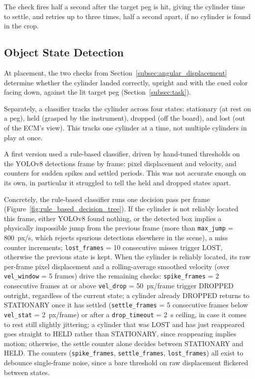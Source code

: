 The check fires half a second after the target peg is hit, giving the
cylinder time to settle, and retries up to three times, half a second
apart, if no cylinder is found in the crop.

\subsection{Object State Detection}
\label{subsec:object_state}

At placement, the two checks from
Section~\ref{subsec:angular_displacement} determine whether the
cylinder landed correctly, upright and with the cued color facing
down, against the lit target peg (Section~\ref{subsec:task}).

Separately, a classifier tracks the cylinder across four states:
stationary (at rest on a peg), held (grasped by the instrument),
dropped (off the board), and lost (out of the ECM's view). This
tracks one cylinder at a time, not multiple cylinders in play at once.

A first version used a rule-based classifier, driven by hand-tuned
thresholds on the YOLOv8 detections frame by frame: pixel
displacement and velocity, and counters for sudden spikes and settled
periods. This was not accurate enough on its own, in particular it
struggled to tell the held and dropped states apart.

Concretely, the rule-based classifier runs one decision pass per
frame (Figure~\ref{fig:rule_based_decision_tree}). If the cylinder is
not reliably located this frame, either YOLOv8 found nothing, or the
detected box implies a physically impossible jump from the previous
frame (more than \texttt{max\_jump} = 800~px/s, which rejects spurious
detections elsewhere in the scene), a miss counter increments;
\texttt{lost\_frames} = 10 consecutive misses trigger LOST, otherwise
the previous state is kept. When the cylinder is reliably located,
its raw per-frame pixel displacement and a rolling-average smoothed
velocity (over \texttt{vel\_window} = 5 frames) drive the remaining
checks: \texttt{spike\_frames} = 2 consecutive frames at or above
\texttt{vel\_drop} = 50~px/frame trigger DROPPED outright, regardless
of the current state; a cylinder already DROPPED returns to
STATIONARY once it has settled (\texttt{settle\_frames} = 5
consecutive frames below \texttt{vel\_stat} = 2~px/frame) or after a
\texttt{drop\_timeout} = 2~s ceiling, in case it comes to rest still
slightly jittering; a cylinder that was LOST and has just reappeared
goes straight to HELD rather than STATIONARY, since reappearing
implies motion; otherwise, the settle counter alone decides between
STATIONARY and HELD. The counters (\texttt{spike\_frames},
\texttt{settle\_frames}, \texttt{lost\_frames}) all exist to debounce
single-frame noise, since a bare threshold on raw displacement
flickered between states.

